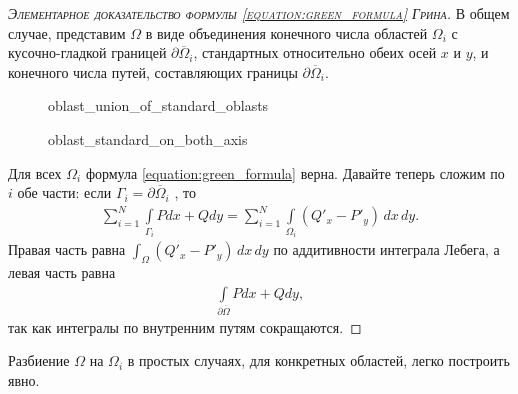 \begin{proof}[\normalfont\textsc{Элементарное доказательство формулы \eqref{equation:green_formula} Грина}]
В общем случае, представим $\Omega$ в виде объединения конечного числа областей $\Omega_i$ с кусочно-гладкой границей $\partial \overline \Omega_i$, стандартных относительно обеих осей $x$ и $y$, и конечного числа путей, составляющих границы $\partial \overline \Omega_i$.

\begin{figure}[ht]
    \centering
    \caption{oblast_union_of_standard_oblasts}
    \label{fig:oblast_union_of_standard_oblasts}
\end{figure}

\begin{figure}[ht]
    \centering
    \caption{oblast_standard_on_both_axis}
    \label{fig:oblast_standard_on_both_axis}
\end{figure}

Для всех $\Omega_i$ формула  \eqref{equation:green_formula} верна. Давайте теперь сложим по  $i$  обе части: если $\Gamma_i = \partial \overline \Omega_i$ , то 
\begin{align*}
 \sum_{i=1}^{N} \int\limits_{\Gamma_i} P dx + Q dy = \sum_{i=1}^{N} \int\limits_{\Omega_i} (Q'_x - P'_y) \, dx \, dy 
.\end{align*} Правая часть равна $\int_{\Omega} (Q'_x - P'_y) \, dx \,dy  $  по аддитивности интеграла Лебега, а левая часть равна
\begin{align*}
 \int\limits_{\partial \overline \Omega} P dx + Q dy
,\end{align*}  так как интегралы по внутренним путям сокращаются.

\end{proof}
\begin{remrk*}
 Разбиение $\Omega$ на $\Omega_i$ в простых случаях, для конкретных областей, легко построить явно.
\end{remrk*}

